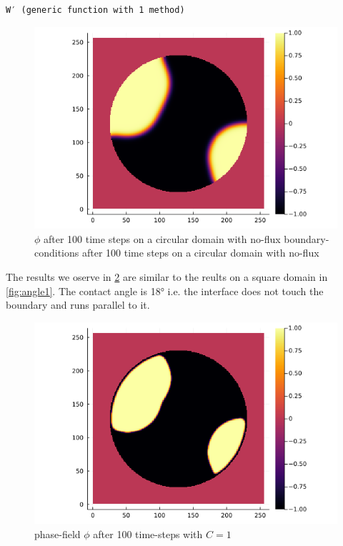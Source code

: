 \documentclass{mimosis}
\begin{document}
\label{}
\begin{verbatim}
W′ (generic function with 1 method)
\end{verbatim}



\begin{figure}[htbp]
\centering
\includegraphics[width=.9\linewidth]{images/angle0c.png}
\caption{\label{fig:angle0c}\(\phi\) after 100 time steps on a circular domain with no-flux boundary-conditions after 100 time steps on a circular domain with no-flux}
\end{figure}



The results we oserve in \ref{fig:angle1c} are similar to the reults on a square domain in \ref{fig:angle1}. The contact angle is 18° i.e. the interface does not touch the boundary and runs parallel to it.
\begin{figure}[htbp]
\centering
\includegraphics[width=.9\linewidth]{images/anfle1c.png}
\caption{\label{fig:angle1c}phase-field \(\phi\) after 100 time-steps with \(C=1\)}
\end{figure}
\end{document}
